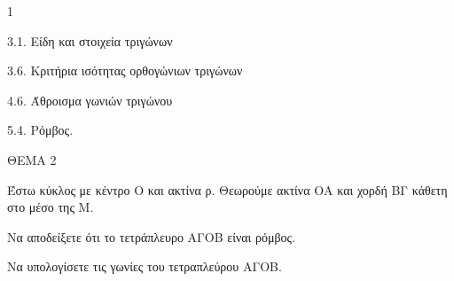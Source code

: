\begin{ylh}{1}
    \item 3.1. Είδη και στοιχεία τριγώνων
    \item 3.6. Κριτήρια ισότητας ορθογώνιων τριγώνων
    \item 4.6. Άθροισμα γωνιών τριγώνου
    \item 5.4. Ρόμβος.
\end{ylh}

ΘΕΜΑ 2

Έστω κύκλος με κέντρο Ο και ακτίνα ρ. Θεωρούμε ακτίνα ΟΑ και χορδή ΒΓ κάθετη στο μέσο της Μ.

\begin{alist}
\item Να αποδείξετε ότι το τετράπλευρο ΑΓΟΒ είναι ρόμβος. 

\item Να υπολογίσετε τις γωνίες του τετραπλεύρου ΑΓΟΒ. 


\begin{center}
\end{center}
\end{alist}
